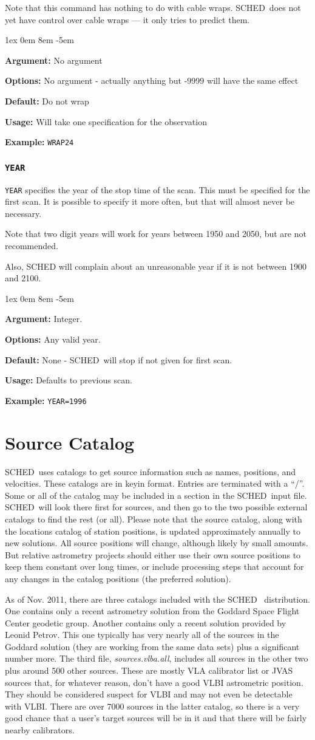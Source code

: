 \documentclass{report}
\newcommand{\sched}{{\sc SCHED}}
\newcommand{\schedb}{{\sc SCHED~}}
\newcommand{\rcwbox}[5]{
  \begin{list}{}{\parsep 1ex  \itemsep 0em
                 \leftmargin 8em  \itemindent -5em }
    \item {\bf Argument:} #1
    \item {\bf Options:}  #2
    \item {\bf Default:}  #3
    \item {\bf Usage:}    #4
    \item {\bf Example:}  #5
  \end{list}
}
\begin{document}
Note that this command has nothing to do with cable wraps.  \schedb does
not yet have control over cable wraps --- it only tries to predict them.

\rcwbox
{No argument}
{No argument - actually anything but -9999 will have the same effect}
{Do not wrap}
{Will take one specification for the observation}
{{\tt WRAP24}}


\subsubsection{\label{MP:YEAR}{\tt YEAR}}

{\tt YEAR} specifies the year of the stop time of the scan. This must
be specified for the first scan.  It is possible to specify it more
often, but that will almost never be necessary.

Note that two digit years will work for years between 1950 and 2050,
but are not recommended.

Also, SCHED will complain about an unreasonable year if it is not between
1900 and 2100.

\rcwbox
{Integer.}
{Any valid year.}
{None - \schedb will stop if not given for first scan.}
{Defaults to previous scan.}
{{\tt YEAR=1996}}



\section{\label{SEC:SRCCAT}Source Catalog}

\schedb uses catalogs to get source information such as names,
positions, and velocities.  These catalogs are in keyin
format. Entries are terminated with a ``/''.  Some or all of the
catalog may be included in a section in the \sched\ input file.
\sched\ will look there first for sources, and then go to the two
possible external catalogs to find the rest (or all).  Please note 
that the source catalog, along with the locations catalog of station
positions, is updated approximately annually to new solutions.  
All source positions will change, although likely by small amounts.
But relative astrometry projects should either use their own 
source positions to keep them constant over long times, or include
processing steps that account for any changes in the catalog positions
(the preferred solution).

As of Nov. 2011, there are three catalogs included with the \schedb
distribution.  One contains only a recent astrometry solution from the
Goddard Space Flight Center geodetic group.  Another contains only a
recent solution provided by Leonid Petrov.  This one typically has
very nearly all of the sources in the Goddard solution (they are
working from the same data sets) plus a significant number more.  The
third file, {\sl sources.vlba.all}, includes all sources in the other
two plus around 500 other sources.  These are mostly VLA calibrator
list or JVAS sources that, for whatever reason, don't have a good VLBI
astrometric position.  They should be considered suspect for VLBI and
may not even be detectable with VLBI.  There are over 7000 sources in
the latter catalog, so there is a very good chance that a user's
target sources will be in it and that there will be fairly nearby
calibrators.
\end{document}
